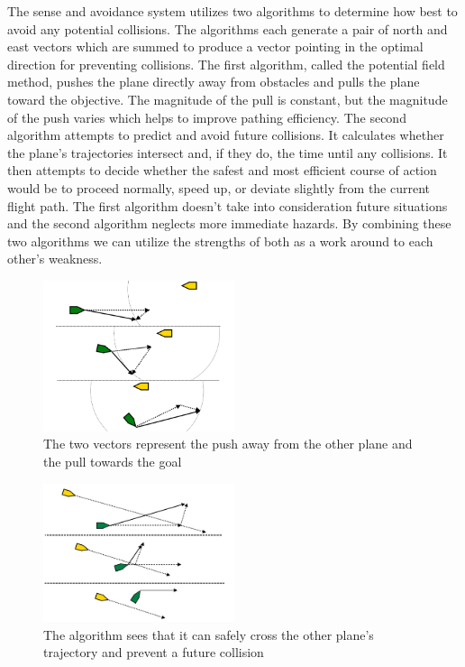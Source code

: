 \documentclass[12pt]{article}
\begin{document}
The sense and avoidance system utilizes two algorithms to determine how best to avoid any potential collisions. The algorithms each generate a pair of north and east vectors which are summed to produce a vector pointing in the optimal direction for preventing collisions. The first algorithm, called the potential field method, pushes the plane directly away from obstacles and pulls the plane toward the objective. The magnitude of the pull is constant, but the magnitude of the push varies which helps to improve pathing efficiency. The second algorithm attempts to predict and avoid future collisions. It calculates whether the plane's trajectories intersect and, if they do, the time until any collisions. It then attempts to decide whether the safest and most efficient course of action would be to proceed normally, speed up, or deviate slightly from the current flight path. The first algorithm doesn't take into consideration future situations and the second algorithm neglects more immediate hazards. By combining these two algorithms we can utilize the strengths of both as a work around to each other's weakness.

\begin{figure}[ht!]
   \centering
   \includegraphics[width=0.5\textwidth]{pushpull.png}
   \caption{The two vectors represent the push away from the other plane and the pull towards the goal}
\end{figure}

\begin{figure}[ht!]
   \centering
   \includegraphics[width=0.5\textwidth]{drift.png}
   \caption{The algorithm sees that it can safely cross the other plane's trajectory and prevent a future collision}
\end{figure}
\end{document}
